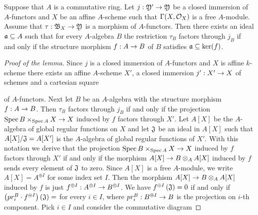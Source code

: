\begin{lemma}\label{lemma:foraffinelocalfactorization}
Suppose that $A$ is a commutative ring. Let $j:{\mathfrak Y}'\rightarrow {\mathfrak Y}$ be a closed immersion of $A$-functors and $X$ be an affine $A$-scheme such that $\Gamma(X,{\mathcal O}_X)$ is a free $A$-module. Assume that $\tau:{\mathfrak B}_X\rightarrow {\mathfrak Y}$ is a morphism of $A$-functors. Then there exists an ideal $\mathfrak{a}\subseteq A$ such that for every $A$-algebra $B$ the restriction $\tau_B$ factors through $j_B$ if and only if the structure morphism $f:A\rightarrow B$ of $B$ satisfies $\mathfrak{a}\subseteq \ker(f)$.
\end{lemma}
\begin{proof}[Proof of the lemma]
Since $j$ is a closed immersion of $A$-functors and $X$ is affine $k$-scheme there exists an affine $A$-scheme $X'$, a closed immersion $j':X'\rightarrow X$ of schemes and a cartesian square
\begin{center}
\end{center}
of $A$-functors. Next let $B$ be an $A$-algebra with the structure morphism $f:A\rightarrow B$. Then $\tau_B$ factors through $j_B$ if and only if the projection $\mathrm{Spec}\, B\times_{\mathrm{Spec}\, A}X\rightarrow X$ induced by $f$ factors through $X'$. Let $A[X]$ be the $A$-algebra of global regular functions on $X$ and let $\mathfrak{J}$ be an ideal in $A[X]$ such that $A[X]/\mathfrak{J} = A[X']$ is the $A$-algebra of global regular functions of $X'$. With this notation we derive that the projection $\mathrm{Spec}\, B\times_{\mathrm{Spec}\, A}X\rightarrow X$ induced by $f$ factors through $X'$ if and only if the morphism $A[X]\rightarrow B\otimes_AA[X]$ induced by $f$ sends every element of $\mathfrak{J}$ to zero. Since $A[X]$ is a free $A$-module, we write $A[X] = A^{\oplus I}$ for some index set $I$. Then the morphism $A[X]\rightarrow B\otimes_AA[X]$ induced by $f$ is just $f^{\oplus I}:A^{\oplus I}\rightarrow B^{\oplus I}$. We have $f^{\oplus I}\left(\mathfrak{J}\right)=0$ if and only if $\left(pr^B_i\cdot f^{\oplus I}\right)\left(\mathfrak{J}\right)=$ for every $i\in I$, where $pr^B_i:B^{\oplus I}\rightarrow B$ is the projection on $i$-th component. Pick $i\in I$ and consider the commutative diagram

\end{proof}
